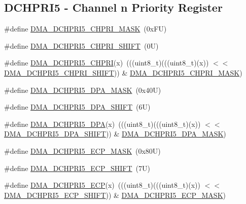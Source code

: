 \subsection*{D\+C\+H\+P\+R\+I5 -\/ Channel n Priority Register}
\begin{DoxyCompactItemize}
\item 
\#define \mbox{\hyperlink{group___d_m_a___register___masks_ga4f7ea16f3982b598833ea289b6af08e1}{D\+M\+A\+\_\+\+D\+C\+H\+P\+R\+I5\+\_\+\+C\+H\+P\+R\+I\+\_\+\+M\+A\+SK}}~(0x\+F\+U)
\item 
\#define \mbox{\hyperlink{group___d_m_a___register___masks_gad92d72515f8f70aeaa7035139b95021e}{D\+M\+A\+\_\+\+D\+C\+H\+P\+R\+I5\+\_\+\+C\+H\+P\+R\+I\+\_\+\+S\+H\+I\+FT}}~(0\+U)
\item 
\#define \mbox{\hyperlink{group___d_m_a___register___masks_ga66cfbbc9f5e4f86305937b1fffdc77df}{D\+M\+A\+\_\+\+D\+C\+H\+P\+R\+I5\+\_\+\+C\+H\+P\+RI}}(x)~(((uint8\+\_\+t)(((uint8\+\_\+t)(x)) $<$$<$ \mbox{\hyperlink{group___d_m_a___register___masks_gad92d72515f8f70aeaa7035139b95021e}{D\+M\+A\+\_\+\+D\+C\+H\+P\+R\+I5\+\_\+\+C\+H\+P\+R\+I\+\_\+\+S\+H\+I\+FT}})) \& \mbox{\hyperlink{group___d_m_a___register___masks_ga4f7ea16f3982b598833ea289b6af08e1}{D\+M\+A\+\_\+\+D\+C\+H\+P\+R\+I5\+\_\+\+C\+H\+P\+R\+I\+\_\+\+M\+A\+SK}})
\item 
\#define \mbox{\hyperlink{group___d_m_a___register___masks_ga7b37f0484175d7e23fd9827d59487a9b}{D\+M\+A\+\_\+\+D\+C\+H\+P\+R\+I5\+\_\+\+D\+P\+A\+\_\+\+M\+A\+SK}}~(0x40\+U)
\item 
\#define \mbox{\hyperlink{group___d_m_a___register___masks_ga7b735d044c9d0e93aeed7f848065dabd}{D\+M\+A\+\_\+\+D\+C\+H\+P\+R\+I5\+\_\+\+D\+P\+A\+\_\+\+S\+H\+I\+FT}}~(6\+U)
\item 
\#define \mbox{\hyperlink{group___d_m_a___register___masks_gae4954e35c4177fa66f5f80fb7e211d22}{D\+M\+A\+\_\+\+D\+C\+H\+P\+R\+I5\+\_\+\+D\+PA}}(x)~(((uint8\+\_\+t)(((uint8\+\_\+t)(x)) $<$$<$ \mbox{\hyperlink{group___d_m_a___register___masks_ga7b735d044c9d0e93aeed7f848065dabd}{D\+M\+A\+\_\+\+D\+C\+H\+P\+R\+I5\+\_\+\+D\+P\+A\+\_\+\+S\+H\+I\+FT}})) \& \mbox{\hyperlink{group___d_m_a___register___masks_ga7b37f0484175d7e23fd9827d59487a9b}{D\+M\+A\+\_\+\+D\+C\+H\+P\+R\+I5\+\_\+\+D\+P\+A\+\_\+\+M\+A\+SK}})
\item 
\#define \mbox{\hyperlink{group___d_m_a___register___masks_ga8d8a7a23ba67b0dd3830251a3ce561d3}{D\+M\+A\+\_\+\+D\+C\+H\+P\+R\+I5\+\_\+\+E\+C\+P\+\_\+\+M\+A\+SK}}~(0x80\+U)
\item 
\#define \mbox{\hyperlink{group___d_m_a___register___masks_ga3872194e99a98cdae0e7378a3570774c}{D\+M\+A\+\_\+\+D\+C\+H\+P\+R\+I5\+\_\+\+E\+C\+P\+\_\+\+S\+H\+I\+FT}}~(7\+U)
\item 
\#define \mbox{\hyperlink{group___d_m_a___register___masks_ga5843358c508708fe912e05951322725d}{D\+M\+A\+\_\+\+D\+C\+H\+P\+R\+I5\+\_\+\+E\+CP}}(x)~(((uint8\+\_\+t)(((uint8\+\_\+t)(x)) $<$$<$ \mbox{\hyperlink{group___d_m_a___register___masks_ga3872194e99a98cdae0e7378a3570774c}{D\+M\+A\+\_\+\+D\+C\+H\+P\+R\+I5\+\_\+\+E\+C\+P\+\_\+\+S\+H\+I\+FT}})) \& \mbox{\hyperlink{group___d_m_a___register___masks_ga8d8a7a23ba67b0dd3830251a3ce561d3}{D\+M\+A\+\_\+\+D\+C\+H\+P\+R\+I5\+\_\+\+E\+C\+P\+\_\+\+M\+A\+SK}})
\end{DoxyCompactItemize}
